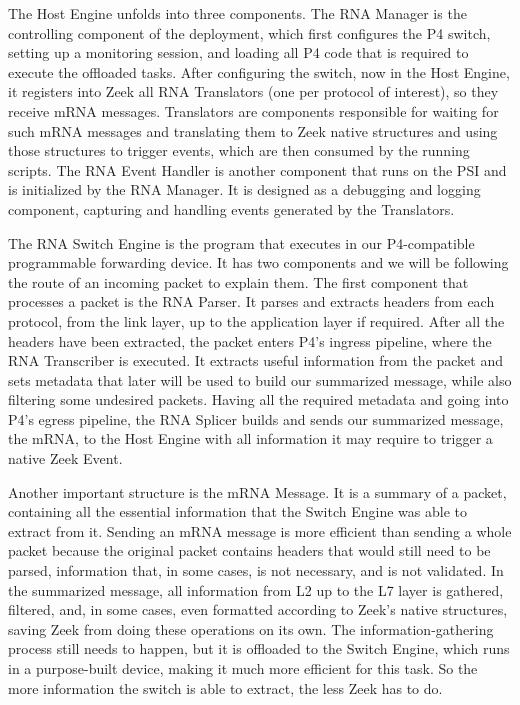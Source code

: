 The Host Engine unfolds into three components. The RNA Manager is the controlling component of the deployment, which first configures the P4 switch, setting up a monitoring session, and loading all P4 code that is required to execute the offloaded tasks. After configuring the switch, now in the Host Engine, it registers into Zeek all RNA Translators (one per protocol of interest), so they receive mRNA messages. Translators are components responsible for waiting for such mRNA messages and translating them to Zeek native structures and using those structures to trigger events, which are then consumed by the running scripts. The RNA Event Handler is another component that runs on the PSI and is initialized by the RNA Manager. It is designed as a debugging and logging component, capturing and handling events generated by the Translators.

The RNA Switch Engine is the program that executes in our P4-compatible programmable forwarding device. It has two components and we will be following the route of an incoming packet to explain them. The first component that processes a packet is the RNA Parser. It parses and extracts headers from each protocol, from the link layer, up to the application layer if required. After all the headers have been extracted, the packet enters P4's ingress pipeline, where the RNA Transcriber is executed. It extracts useful information from the packet and sets metadata that later will be used to build our summarized message, while also filtering some undesired packets. Having all the required metadata and going into P4's egress pipeline, the RNA Splicer builds and sends our summarized message, the mRNA, to the Host Engine with all information it may require to trigger a native Zeek Event.

Another important structure is the mRNA Message. It is a summary of a packet, containing all the essential information that the Switch Engine was able to extract from it. Sending an mRNA message is more efficient than sending a whole packet because the original packet contains headers that would still need to be parsed, information that, in some cases, is not necessary, and is not validated. In the summarized message, all information from L2 up to the L7 layer is gathered, filtered, and, in some cases, even formatted according to Zeek's native structures, saving Zeek from doing these operations on its own. The information-gathering process still needs to happen, but it is offloaded to the Switch Engine, which runs in a purpose-built device, making it much more efficient for this task. So the more information the switch is able to extract, the less Zeek has to do.


